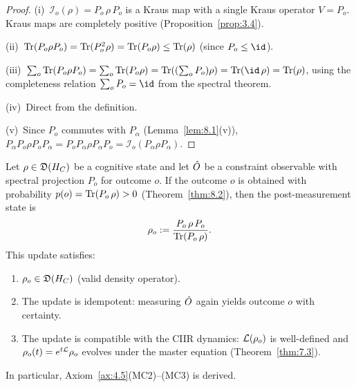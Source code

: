 \begin{proof}
(i)~$\mathcal{I}_o(\rho) = P_o\,\rho\,P_o$ is a Kraus map with a
single Kraus operator $V = P_o$.  Kraus maps are completely positive
(Proposition~\ref{prop:3.4}).

(ii)~$\mathrm{Tr}(P_o\rho P_o) = \mathrm{Tr}(P_o^2\rho) = \mathrm{Tr}(P_o\rho) \leq
\mathrm{Tr}(\rho)$ (since $P_o \leq \id$).

(iii)~$\sum_o \Tr(P_o\rho P_o) = \sum_o \Tr(P_o\rho)
= \Tr((\sum_o P_o)\rho) = \Tr(\id\,\rho) = \Tr(\rho)$, using the
completeness relation $\sum_o P_o = \id$ from the spectral theorem.

(iv)~Direct from the definition.

(v)~Since $P_o$ commutes with $P_\alpha$
(Lemma~\ref{lem:8.1}(v)), $P_\alpha P_o\rho P_o P_\alpha
= P_o P_\alpha\rho P_\alpha P_o = \mathcal{I}_o(P_\alpha\rho P_\alpha)$.
\end{proof}

\begin{theorem}
\label{thm:8.3}
Let $\rho \in \mathfrak{D}(H_C)$ be a cognitive state and let $\hat{O}$
be a constraint observable with spectral projection $P_o$ for outcome
$o$.  If the outcome $o$ is obtained with probability
$p(o) = \mathrm{Tr}(P_o\,\rho) > 0$ \textup{(}Theorem~\textup{\ref{thm:8.2})},
then the post-measurement state is
\[
  \rho_o := \frac{P_o\,\rho\,P_o}{\mathrm{Tr}(P_o\,\rho)}.
\]
This update satisfies:
\begin{enumerate}
  \item[\textup{(i)}] $\rho_o \in \mathfrak{D}(H_C)$
    \textup{(}valid density operator\textup{)}.
  \item[\textup{(ii)}] The update is idempotent: measuring $\hat{O}$ again
    yields outcome $o$ with certainty.
  \item[\textup{(iii)}] The update is compatible with the CIIR dynamics:
    $\mathcal{L}(\rho_o)$ is well-defined and
    $\rho_o(t) = e^{t\mathcal{L}}\rho_o$ evolves under the master equation
    \textup{(}Theorem~\textup{\ref{thm:7.3})}.
\end{enumerate}
In particular, Axiom~\textup{\ref{ax:4.5}(MC2)--(MC3)} is derived.
\end{theorem}

